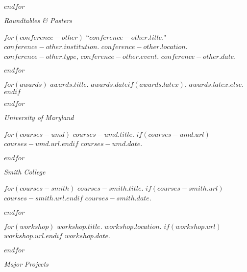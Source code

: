 \documentclass[11pt,article,oneside]{memoir}
\begin{document}
\smallskip
$endfor$
\medskip

\pagebreak[1]
\ind \emph{Roundtables \& Posters}

\smallskip

$for(conference-other)$
\ind ``$conference-other.title$." $conference-other.institution$. $conference-other.location$. $conference-other.type$, \emph{$conference-other.event$}. $conference-other.date$. \normalsize

\smallskip
$endfor$

\bigskip
\pagebreak[1]


$for(awards)$
\ind $awards.title$. $awards.date$$if(awards.latex)$. $awards.latex$.$else${.}$endif$
\smallskip

$endfor$

\bigskip
\pagebreak[1]


\ind \emph{University of Maryland}

\smallskip

$for(courses-umd)$
\ind $courses-umd.title$. $if(courses-umd.url)$\href{$courses-smith.url$}{$courses-umd.url$}.$endif$ $courses-umd.date$.

$endfor$
\smallskip
\medskip

\ind \emph{Smith College}

\smallskip

$for(courses-smith)$
\ind $courses-smith.title$. $if(courses-smith.url)$\href{$courses-smith.url$}{$courses-smith.url$}.$endif$ $courses-smith.date$.

$endfor$
\bigskip
\pagebreak[1]


$for(workshop)$
\ind $workshop.title$. $workshop.location$. $if(workshop.url)$\href{$workshop.url$}{$workshop.url$}.$endif$ $workshop.date$.

\smallskip

$endfor$

\bigskip
\pagebreak[1]


\ind \emph{Major Projects}

\smallskip
\end{document}
